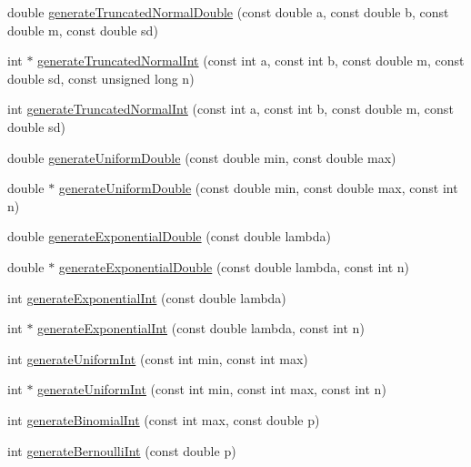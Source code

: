 \begin{DoxyCompactItemize}
\item 
double \hyperlink{class_random_number_generator_a4525691017d9c6dc6b84aa2f478b303a}{generate\+Truncated\+Normal\+Double} (const double a, const double b, const double m, const double sd)
\item 
int $\ast$ \hyperlink{class_random_number_generator_a9204cf57bae1189b576307699b07747b}{generate\+Truncated\+Normal\+Int} (const int a, const int b, const double m, const double sd, const unsigned long n)
\item 
int \hyperlink{class_random_number_generator_a43b6d7ad4e907d9e87451c1d7ad5a651}{generate\+Truncated\+Normal\+Int} (const int a, const int b, const double m, const double sd)
\item 
double \hyperlink{class_random_number_generator_a0cbfb491d75d113c5bd0816576cb56ed}{generate\+Uniform\+Double} (const double min, const double max)
\item 
double $\ast$ \hyperlink{class_random_number_generator_a208c3dcccf6aa6a62151a98d58264d08}{generate\+Uniform\+Double} (const double min, const double max, const int n)
\item 
double \hyperlink{class_random_number_generator_a95d897f9265ece8d5ee18fbf2802b844}{generate\+Exponential\+Double} (const double lambda)
\item 
double $\ast$ \hyperlink{class_random_number_generator_ad2cb2a790be0478f58fc9eb5f01adbb7}{generate\+Exponential\+Double} (const double lambda, const int n)
\item 
int \hyperlink{class_random_number_generator_ab3b999e087c241671643b6c613bc0fd9}{generate\+Exponential\+Int} (const double lambda)
\item 
int $\ast$ \hyperlink{class_random_number_generator_ad7a58e7c0ebf74475a4980d0df30e52a}{generate\+Exponential\+Int} (const double lambda, const int n)
\item 
int \hyperlink{class_random_number_generator_aa2dd0dd9e4b520517cd31466c7066a0a}{generate\+Uniform\+Int} (const int min, const int max)
\item 
int $\ast$ \hyperlink{class_random_number_generator_a5a3645c649783d3208319a016f744c5f}{generate\+Uniform\+Int} (const int min, const int max, const int n)
\item 
int \hyperlink{class_random_number_generator_a417f97fb1a4362621b60107d98c3b4e7}{generate\+Binomial\+Int} (const int max, const double p)
\item 
int \hyperlink{class_random_number_generator_a480c13d951cbcc9dd3a3afa29145c097}{generate\+Bernoulli\+Int} (const double p)

\end{DoxyCompactItemize}
